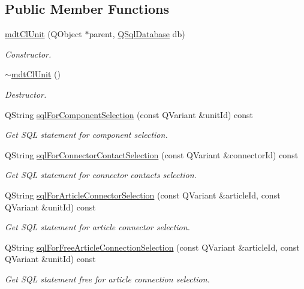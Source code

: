 \subsection*{Public Member Functions}
\begin{DoxyCompactItemize}
\item 
\hyperlink{classmdt_cl_unit_a8aa2f0ab9aa2e5542dc97d51cf21b15c}{mdt\-Cl\-Unit} (Q\-Object $\ast$parent, \hyperlink{class_q_sql_database}{Q\-Sql\-Database} db)
\begin{DoxyCompactList}\small\item\em Constructor. \end{DoxyCompactList}\item 
\hyperlink{classmdt_cl_unit_a1eb2f9f1f96974b424c5f27d178e59c1}{$\sim$mdt\-Cl\-Unit} ()
\begin{DoxyCompactList}\small\item\em Destructor. \end{DoxyCompactList}\item 
Q\-String \hyperlink{classmdt_cl_unit_ab2c695848d375d4a475756106bb1558c}{sql\-For\-Component\-Selection} (const Q\-Variant \&unit\-Id) const 
\begin{DoxyCompactList}\small\item\em Get S\-Q\-L statement for component selection. \end{DoxyCompactList}\item 
Q\-String \hyperlink{classmdt_cl_unit_a02c7a25bbe2dbc849410a9ab2861f559}{sql\-For\-Connector\-Contact\-Selection} (const Q\-Variant \&connector\-Id) const 
\begin{DoxyCompactList}\small\item\em Get S\-Q\-L statement for connector contacts selection. \end{DoxyCompactList}\item 
Q\-String \hyperlink{classmdt_cl_unit_af3d59cb540d48903916b2397bff16d4b}{sql\-For\-Article\-Connector\-Selection} (const Q\-Variant \&article\-Id, const Q\-Variant \&unit\-Id) const 
\begin{DoxyCompactList}\small\item\em Get S\-Q\-L statement for article connector selection. \end{DoxyCompactList}\item 
Q\-String \hyperlink{classmdt_cl_unit_a1d19734ccf1bd4d3d86b9cfd5a8307ad}{sql\-For\-Free\-Article\-Connection\-Selection} (const Q\-Variant \&article\-Id, const Q\-Variant \&unit\-Id) const 
\begin{DoxyCompactList}\small\item\em Get S\-Q\-L statement free for article connection selection. \end{DoxyCompactList}\item 

\end{DoxyCompactItemize}
